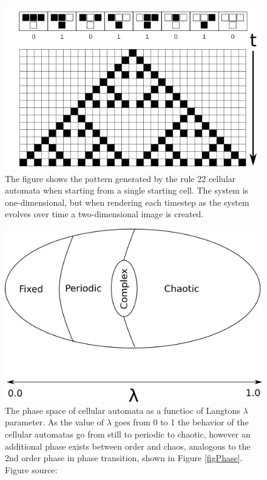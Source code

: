 \begin{figure}[h!]
  \centering
  \includegraphics[width=1\textwidth]{fig/ca22t.png}
  \caption[Rule 22 cellular automata]{
    The figure shows the pattern generated by the rule 22 cellular automata when
    starting from a single starting cell.
    The system is one-dimensional, but when rendering each timestep as the
    system evolves over time a two-dimensional image is created.
  }
  \label{figCA22}
\end{figure}
\begin{figure}[h!]
  \centering
  \includegraphics[width=1\textwidth]{fig/egg.png}
  \caption[Phase space of cellular automata]{
    The phase space of cellular automata as a functioc of Langtons $λ$
    parameter.
    As the value of $λ$ goes from 0 to 1 the behavior of the cellular automatas
    go from still to periodic to chaotic, however an additional phase exists
    between order and chaos, analogous to the 2nd order phase in phase
    transition, shown in Figure \ref{figPhase}.
    Figure source: \cite{LANGTON91}
  }
  \label{figCAegg}
\end{figure}
